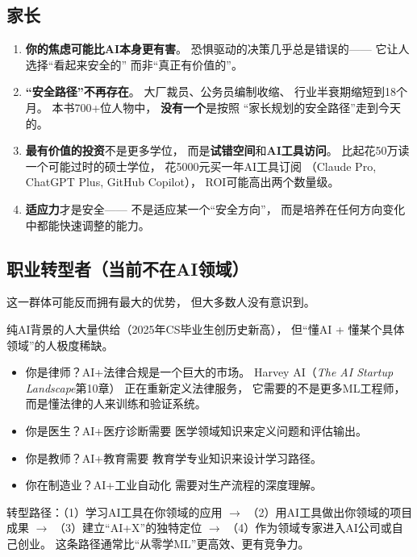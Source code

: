 \subsection{家长}

\begin{warnbox}[给家长的直言]
\begin{enumerate}
  \item \textbf{你的焦虑可能比AI本身更有害}。
    恐惧驱动的决策几乎总是错误的——
    它让人选择``看起来安全的''
    而非``真正有价值的''。
  \item \textbf{``安全路径''不再存在}。
    大厂裁员、公务员编制收缩、
    行业半衰期缩短到18个月。
    本书700+位人物中，
    \textbf{没有一个}是按照
    ``家长规划的安全路径''走到今天的。
  \item \textbf{最有价值的投资}不是更多学位，
    而是\textbf{试错空间}和\textbf{AI工具访问}。
    比起花50万读一个可能过时的硕士学位，
    花5000元买一年AI工具订阅
    （Claude Pro, ChatGPT Plus, GitHub Copilot），
    ROI可能高出两个数量级。
  \item \textbf{适应力}才是安全——
    不是适应某一个``安全方向''，
    而是培养在任何方向变化中都能快速调整的能力。
\end{enumerate}
\end{warnbox}

\subsection{职业转型者（当前不在AI领域）}

这一群体可能反而拥有最大的优势，
但大多数人没有意识到。

\begin{keybox}[你的领域知识是稀缺资产]
纯AI背景的人大量供给（2025年CS毕业生创历史新高），
但``懂AI + 懂某个具体领域''的人极度稀缺。
\begin{itemize}
  \item 你是律师？AI+法律合规是一个巨大的市场。
    Harvey AI（\textit{The AI Startup Landscape}第10章）
    正在重新定义法律服务，
    它需要的不是更多ML工程师，
    而是懂法律的人来训练和验证系统。
  \item 你是医生？AI+医疗诊断需要
    医学领域知识来定义问题和评估输出。
  \item 你是教师？AI+教育需要
    教育学专业知识来设计学习路径。
  \item 你在制造业？AI+工业自动化
    需要对生产流程的深度理解。
\end{itemize}

转型路径：（1）学习AI工具在你领域的应用
$\rightarrow$ （2）用AI工具做出你领域的项目成果
$\rightarrow$ （3）建立``AI+X''的独特定位
$\rightarrow$ （4）作为领域专家进入AI公司或自己创业。
这条路径通常比``从零学ML''更高效、更有竞争力。
\end{keybox}


